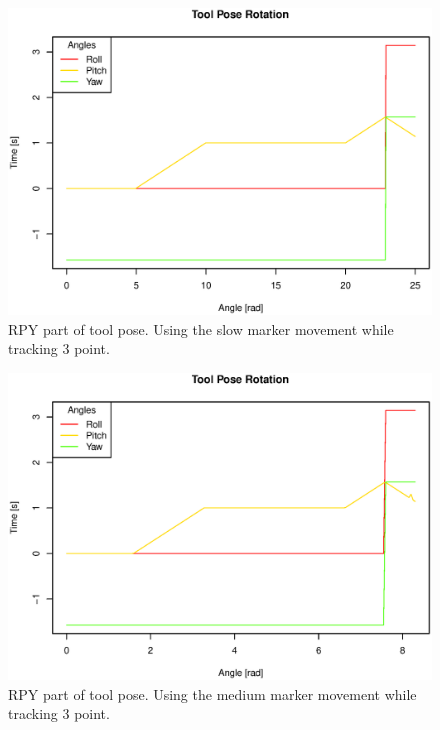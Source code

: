 \begin{figure}[H]
\centering
\includegraphics[width= \linewidth]{graphics/robotics/toolPose_slow_3pt}
\caption{RPY part of tool pose. Using the slow marker movement while tracking 3 point.}
\label{fig:toolpose_slow_3p_rpy}
\end{figure}

\begin{figure}[H]
\centering
\includegraphics[width= \linewidth]{graphics/robotics/toolPose_medium_3pt}
\caption{RPY part of tool pose. Using the medium marker movement while tracking 3 point.}
\label{fig:toolpose_medium_3p_rpy}
\end{figure}

